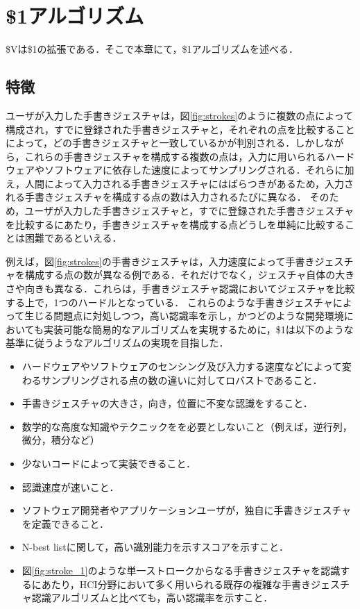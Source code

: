 \chapter{\$1アルゴリズム}
\$Vは\$1の拡張である．そこで本章にて，\$1アルゴリズムを述べる．

\section{特徴}
ユーザが入力した手書きジェスチャは，図\ref{fig:strokes}のように複数の点によって構成され，すでに登録された手書きジェスチャと，それぞれの点を比較することによって，どの手書きジェスチャと一致しているかが判別される．しかしながら，これらの手書きジェスチャを構成する複数の点は，入力に用いられるハードウェアやソフトウェアに依存した速度によってサンプリングされる．それらに加え，人間によって入力される手書きジェスチャにはばらつきがあるため，入力される手書きジェスチャを構成する点の数は入力されるたびに異なる．
そのため，ユーザが入力した手書きジェスチャと，すでに登録された手書きジェスチャを比較するにあたり，手書きジェスチャを構成する点どうしを単純に比較することは困難であるといえる．


例えば，図\ref{fig:strokes}の手書きジェスチャは，入力速度によって手書きジェスチャを構成する点の数が異なる例である．それだけでなく，ジェスチャ自体の大きさや向きも異なる．これらは，手書きジェスチャ認識においてジェスチャを比較する上で，1つのハードルとなっている．
これらのような手書きジェスチャによって生じる問題点に対処しつつ，高い認識率を示し，かつどのような開発環境においても実装可能な簡易的なアルゴリズムを実現するために，\$1は以下のような基準に従うようなアルゴリズムの実現を目指した．

\begin{itemize}
\item ハードウェアやソフトウェアのセンシング及び入力する速度などによって変わるサンプリングされる点の数の違いに対してロバストであること．
\item 手書きジェスチャの大きさ，向き，位置に不変な認識をすること．
\item 数学的な高度な知識やテクニックをを必要としないこと（例えば，逆行列，微分，積分など）
\item 少ないコードによって実装できること．
\item 認識速度が速いこと．
\item ソフトウェア開発者やアプリケーションユーザが，独自に手書きジェスチャを定義できること．
\item N-best listに関して，高い識別能力を示すスコアを示すこと．
\item 図\ref{fig:stroke_1}のような単一ストロークからなる手書きジェスチャを認識するにあたり，HCI分野において多く用いられる既存の複雑な手書きジェスチャ認識アルゴリズムと比べても，高い認識率を示すこと．
\end{itemize}

